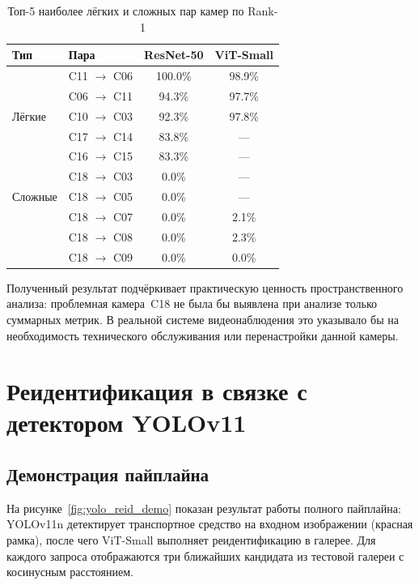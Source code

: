 \begin{table}[H]
  \centering
  \caption{Топ-5 наиболее лёгких и сложных пар камер по Rank-1}
  \label{tab:camera_pairs}
  \begin{tabular}{llcc}
    \hline
    \textbf{Тип} & \textbf{Пара} & \textbf{ResNet-50} & \textbf{ViT-Small} \\
    \hline
    \multirow{5}{*}{Лёгкие} &
      C11 $\to$ C06 & 100.0\% & 98.9\% \\
    & C06 $\to$ C11 & 94.3\%  & 97.7\% \\
    & C10 $\to$ C03 & 92.3\%  & 97.8\% \\
    & C17 $\to$ C14 & 83.8\%  & — \\
    & C16 $\to$ C15 & 83.3\%  & — \\
    \hline
    \multirow{3}{*}{Сложные} &
      C18 $\to$ C03 & 0.0\%  & — \\
    & C18 $\to$ C05 & 0.0\%  & — \\
    & C18 $\to$ C07 & 0.0\%  & 2.1\% \\
    & C18 $\to$ C08 & 0.0\%  & 2.3\% \\
    & C18 $\to$ C09 & 0.0\%  & 0.0\% \\
    \hline
  \end{tabular}
\end{table}

Полученный результат подчёркивает практическую ценность пространственного анализа:
проблемная камера~C18 не была бы выявлена при анализе только суммарных метрик.
В реальной системе видеонаблюдения это указывало бы на необходимость технического
обслуживания или перенастройки данной камеры.

\section{Реидентификация в связке с детектором YOLOv11}
\label{sec:yolo_reid}

\subsection{Демонстрация пайплайна}

На рисунке~\ref{fig:yolo_reid_demo} показан результат работы полного пайплайна:
YOLOv11n детектирует транспортное средство на входном изображении (красная рамка),
после чего ViT-Small выполняет реидентификацию в галерее.
Для каждого запроса отображаются три ближайших кандидата из тестовой галереи
с косинусным расстоянием.


